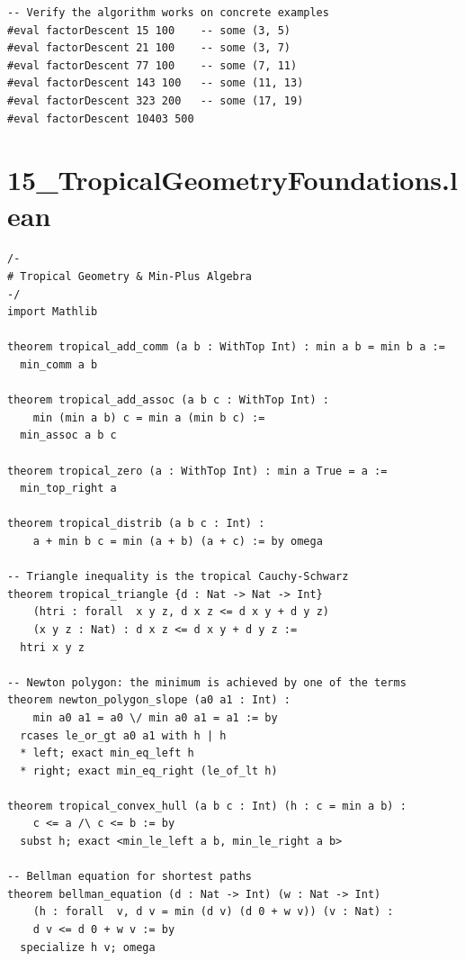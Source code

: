 \documentclass[11pt,twoside,openright]{book}
\theoremstyle{definition}
\theoremstyle{remark}
\begin{document}
\begin{lstlisting}[style=lean]
-- Verify the algorithm works on concrete examples
#eval factorDescent 15 100    -- some (3, 5)
#eval factorDescent 21 100    -- some (3, 7)
#eval factorDescent 77 100    -- some (7, 11)
#eval factorDescent 143 100   -- some (11, 13)
#eval factorDescent 323 200   -- some (17, 19)
#eval factorDescent 10403 500
\end{lstlisting}

\clearpage

\section*{15\_TropicalGeometryFoundations.lean}

\begin{lstlisting}[style=lean]
/-
# Tropical Geometry & Min-Plus Algebra
-/
import Mathlib

theorem tropical_add_comm (a b : WithTop Int) : min a b = min b a :=
  min_comm a b

theorem tropical_add_assoc (a b c : WithTop Int) :
    min (min a b) c = min a (min b c) :=
  min_assoc a b c

theorem tropical_zero (a : WithTop Int) : min a True = a :=
  min_top_right a

theorem tropical_distrib (a b c : Int) :
    a + min b c = min (a + b) (a + c) := by omega

-- Triangle inequality is the tropical Cauchy-Schwarz
theorem tropical_triangle {d : Nat -> Nat -> Int}
    (htri : forall  x y z, d x z <= d x y + d y z)
    (x y z : Nat) : d x z <= d x y + d y z :=
  htri x y z

-- Newton polygon: the minimum is achieved by one of the terms
theorem newton_polygon_slope (a0 a1 : Int) :
    min a0 a1 = a0 \/ min a0 a1 = a1 := by
  rcases le_or_gt a0 a1 with h | h
  * left; exact min_eq_left h
  * right; exact min_eq_right (le_of_lt h)

theorem tropical_convex_hull (a b c : Int) (h : c = min a b) :
    c <= a /\ c <= b := by
  subst h; exact <min_le_left a b, min_le_right a b>

-- Bellman equation for shortest paths
theorem bellman_equation (d : Nat -> Int) (w : Nat -> Int)
    (h : forall  v, d v = min (d v) (d 0 + w v)) (v : Nat) :
    d v <= d 0 + w v := by
  specialize h v; omega

\end{lstlisting}

\clearpage
\end{document}
